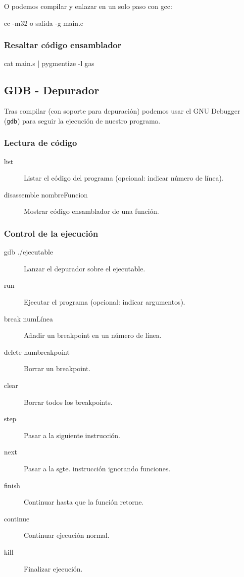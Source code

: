 \documentclass[11pt]{scrartcl}
\begin{document}
O podemos compilar y enlazar en un solo paso con gcc:

\begin{bashcode}
cc -m32 o salida -g main.c
\end{bashcode}

\subsubsection{Resaltar código ensamblador}

\begin{bashcode}
cat main.s | pygmentize -l gas
\end{bashcode}


\subsection{GDB - Depurador}

Tras compilar (con soporte para depuración) podemos usar el GNU Debugger
(\texttt{gdb}) para seguir la ejecución de nuestro programa. 

\subsubsection{Lectura de código}

\begin{description}
  \item[list] Listar el código del programa (opcional: indicar número de línea).
  \item[disassemble nombreFuncion] Mostrar código ensamblador de una función.
\end{description}

\subsubsection{Control de la ejecución}

\begin{description}
\item[gdb ./ejecutable] Lanzar el depurador sobre el ejecutable.
\item[run] Ejecutar el programa (opcional: indicar argumentos).
\item[break numLínea] Añadir un breakpoint en un número de línea.
\item[delete numbreakpoint] Borrar un breakpoint.
\item[clear] Borrar todos los breakpoints.  
  \item[step] Pasar a la siguiente instrucción.
  \item[next] Pasar a la sgte. instrucción ignorando funciones.
  \item[finish] Continuar hasta que la función retorne.
  \item[continue] Continuar ejecución normal.
  \item[kill] Finalizar ejecución.
\end{description}
\end{document}
